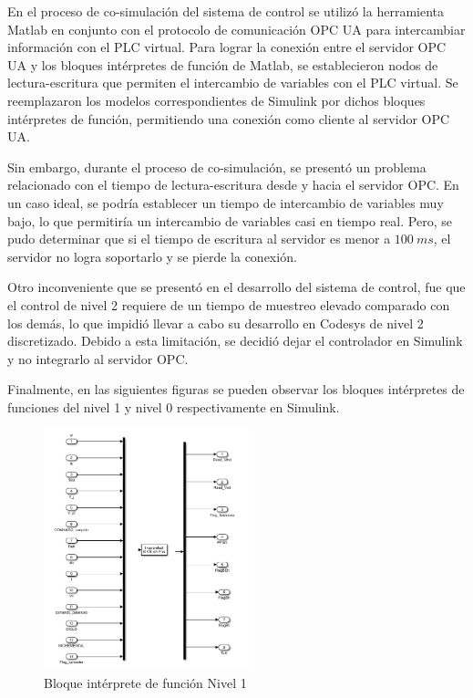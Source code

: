 \documentclass[11pt]{article}
\begin{document}
En el proceso de co-simulación del sistema de control se utilizó la herramienta Matlab en conjunto con el protocolo de comunicación OPC UA para intercambiar información con el PLC virtual. Para lograr la conexión entre el servidor OPC UA y los bloques intérpretes de función de Matlab, se establecieron nodos de lectura-escritura que permiten el intercambio de variables con el PLC virtual. Se reemplazaron los modelos correspondientes de Simulink por dichos bloques intérpretes de función, permitiendo una conexión como cliente al servidor OPC UA.

Sin embargo, durante el proceso de co-simulación, se presentó un problema relacionado con el tiempo de lectura-escritura desde y hacia el servidor OPC. En un caso ideal, se podría establecer un tiempo de intercambio de variables muy bajo, lo que permitiría un intercambio de variables casi en tiempo real. Pero, se pudo determinar que si el tiempo de escritura al servidor es menor a $100\ ms$, el servidor no logra soportarlo y se pierde la conexión.

Otro inconveniente que se presentó en el desarrollo del sistema de control, fue que el control de nivel 2 requiere de un tiempo de muestreo elevado comparado con los demás, lo que impidió llevar a cabo su desarrollo en Codesys de nivel 2 discretizado. Debido a esta limitación, se decidió dejar el controlador en Simulink y no integrarlo al servidor OPC.

Finalmente, en las siguientes figuras se pueden observar los bloques intérpretes de funciones del nivel 1 y nivel 0 respectivamente en Simulink.

\begin{figure}[!h]
	\centering
	\includegraphics[width=0.53\textwidth]{images/matlab_codesys_nivel1.png}
	\caption{Bloque intérprete de función Nivel 1}
	\label{fig:bloque_interprete_funcion_nivel_1}
\end{figure}
\end{document}
